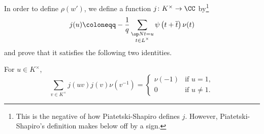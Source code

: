 \documentclass[../main.tex]{subfiles}
\begin{document}
In order to define $\rho(w')$, we define a function $j\colon K^\times\to\CC$ by\footnote{This is the negative of how Piatetski-Shapiro defines $j$. However, Piatetski-Shapiro's definition makes  below off by a sign.}
\begin{equation}
	j(u)\coloneqq-\frac1q\sum_{\substack{\op Nt=u\\t\in L^\times}}\psi\left(t+\overline t\right)\nu(t) \label{eq:def-cusp-j}
\end{equation}
and prove that it satisfies the following two identities.
\begin{lemma} \label{lem:j1}
	For $u\in K^\times$,
	\[\sum_{v\in K^\times}j(uv)j(v)\nu\left(v^{-1}\right)=\begin{cases}
		\nu(-1) & \text{if }u=1, \\
		0 & \text{if }u\ne1.
	\end{cases}\]
\end{lemma}
\end{document}
